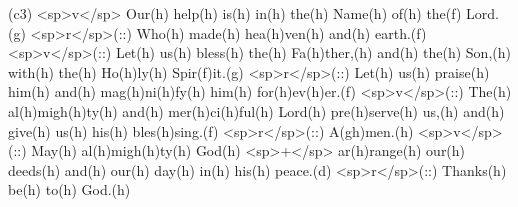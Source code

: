 (c3) <sp>v</sp> Our(h) help(h) is(h) in(h) the(h) Name(h) of(h) the(f) Lord.(g) <sp>r</sp>(::) Who(h) made(h) hea(h)ven(h) and(h) earth.(f) <sp>v</sp>(::) Let(h) us(h) bless(h) the(h) Fa(h)ther,(h) and(h) the(h) Son,(h) with(h) the(h) Ho(h)ly(h) Spir(f)it.(g) <sp>r</sp>(::) Let(h) us(h) praise(h) him(h) and(h) mag(h)ni(h)fy(h) him(h) for(h)ev(h)er.(f) <sp>v</sp>(::) The(h) al(h)migh(h)ty(h) and(h) mer(h)ci(h)ful(h) Lord(h) pre(h)serve(h) us,(h) and(h) give(h) us(h) his(h) bles(h)sing.(f) <sp>r</sp>(::) A(gh)men.(h) <sp>v</sp>(::) May(h) al(h)migh(h)ty(h) God(h) <sp>+</sp> ar(h)range(h) our(h) deeds(h) and(h) our(h) day(h) in(h) his(h) peace.(d) <sp>r</sp>(::) Thanks(h) be(h) to(h) God.(h)